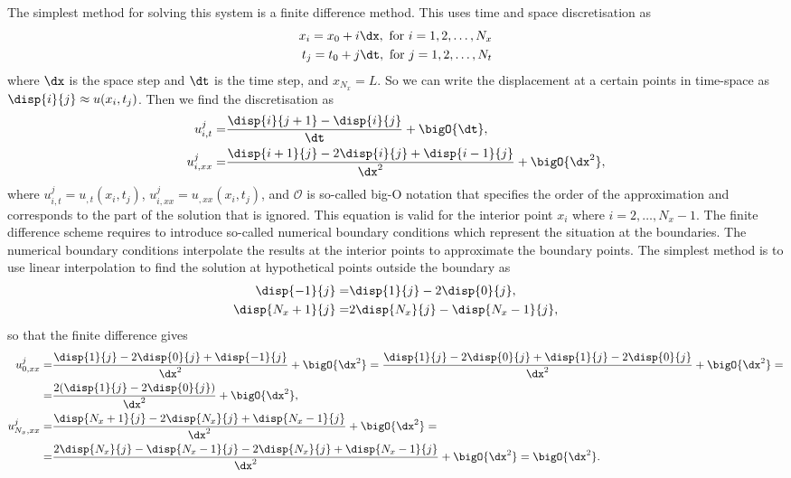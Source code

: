 \documentclass[twoside,a4paper,12pt]{article}
\begin{document}
The simplest method for solving this system is a finite difference
method. This uses time and space discretisation as
%
\begin{subequations}
  \begin{align}
    x_i = x_0 + i\dx, \text{ for } i = 1, 2, \dots, N_x \\
    t_j = t_0 + j\dt, \text{ for } j = 1, 2, \dots, N_t
  \end{align} \label{eq:discr}
\end{subequations}
%
where $\dx$ is the space step and $\dt$ is the time step, and $x_{N_x} = L$.  So we can
write the displacement at a certain points in time-space as
$\disp{i}{j} \approx u(x_i,t_j)$. Then we find the discretisation as
%
\begin{subequations}
  \begin{align}
    u_{i,t}^j  =& \frac{\disp{i}{j+1} - \disp{i}{j}}{\dt} + \bigO{\dt}, \label{eq:fin-diff-a}\\
    u_{i,xx}^j =& \frac{\disp{i+1}{j} - 2\disp{i}{j} + \disp{i-1}{j}}{\dx^2} + \bigO{\dx^2},
  \end{align}\label{eq:fin-diff}
\end{subequations}
%
where $u_{i,t}^j = u_{,t}(x_i,t_j)$, $u_{i,xx}^j = u_{,xx}(x_i,t_j)$,
and $\mathcal{O}$ is so-called big-O notation that specifies the order
of the approximation and corresponds to the part of the solution that
is ignored. This equation is valid for the interior point $x_i$ where
$i = 2,\dots, N_x-1$. The finite difference scheme requires to
introduce so-called numerical boundary conditions which represent the
situation at the boundaries. The numerical boundary conditions
interpolate the results at the interior points to approximate the
boundary points. The simplest method is to use linear interpolation to
find the solution at hypothetical points outside the boundary as
%
\begin{subequations}
\begin{align}
  \disp{-1}{j} =& \disp{1}{j} - 2\disp{0}{j}, \\
  \disp{N_x+1}{j} =& 2\disp{N_x}{j} - \disp{N_x-1}{j},
\end{align}
\end{subequations}
%
so that the finite difference gives
%
\begin{align}
  u_{0,xx}^j =& \frac{\disp{1}{j} - 2\disp{0}{j} + \disp{-1}{j}}{\dx^2} + \bigO{\dx^2} =
  \frac{\disp{1}{j} - 2\disp{0}{j} + \disp{1}{j} - 2\disp{0}{j}}{\dx^2} + \bigO{\dx^2} =\nonumber \\
  =&\frac{2(\disp{1}{j} - 2\disp{0}{j})}{\dx^2} + \bigO{\dx^2},
  \\
  u_{N_x,xx}^j =& \frac{\disp{N_x+1}{j} - 2\disp{N_x}{j} + \disp{N_x-1}{j}}{\dx^2} + \bigO{\dx^2} =\nonumber \\
  =&\frac{2\disp{N_x}{j} - \disp{N_x-1}{j} - 2\disp{N_x}{j} + \disp{N_x-1}{j}}{\dx^2} + \bigO{\dx^2} = \bigO{\dx^2}.
     \label{eq:error-bigO}
\end{align}
\end{document}

